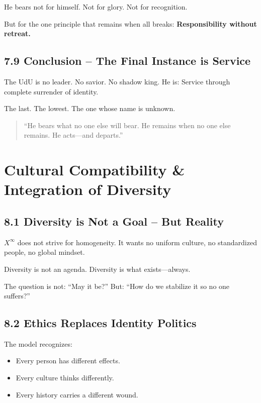 \documentclass[12pt,a4paper]{book}
\begin{document}
He bears not for himself. Not for glory. Not for recognition.

But for the one principle that remains when all breaks:  
\textbf{Responsibility without retreat.}

\section*{7.9 Conclusion – The Final Instance is Service}

The UdU is no leader. No savior. No shadow king.  
He is: Service through complete surrender of identity.

The last. The lowest. The one whose name is unknown.

\begin{quote}
“He bears what no one else will bear.  
He remains when no one else remains.  
He acts—and departs.”  
\end{quote}

\chapter{Cultural Compatibility \& Integration of Diversity}

\section*{8.1 Diversity is Not a Goal – But Reality}

$X^\infty$ does not strive for homogeneity.  
It wants no uniform culture, no standardized people, no global mindset.

Diversity is not an agenda.  
Diversity is what exists—always.

The question is not: “May it be?”  
But: “How do we stabilize it so no one suffers?”

\section*{8.2 Ethics Replaces Identity Politics}

The model recognizes:

\begin{itemize}
    \item Every person has different effects.
    \item Every culture thinks differently.
    \item Every history carries a different wound.
\end{itemize}
\end{document}
